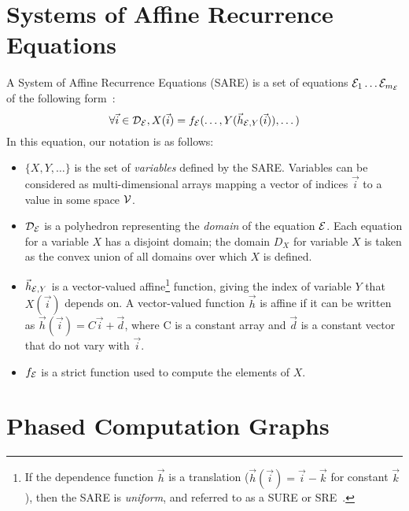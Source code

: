 \section{Systems of Affine Recurrence Equations}

A System of Affine Recurrence Equations (SARE) is a set of equations
${\cal E}_1 \dots {\cal E}_{m_{\cal E}}$ of the following form~\cite{DRV00}:
\begin{equation}
\forall {\vec i} \in {\cal D_{\cal E}}, X({\vec i}) = f_{\cal E}(\dots, Y({\vec h}_{{\cal
E}, Y}({\vec i})), \dots)
\label{eq:sare}
\end{equation}
In this equation, our notation is as follows:
\begin{itemize}

\item $\{X, Y, \dots\}$ is the set of {\it variables} defined by the
SARE.  Variables can be considered as multi-dimensional arrays mapping
a vector of indices ${\vec i}$ to a value in some space ${\cal V}$.

\item ${\cal D_{\cal E}}$ is a polyhedron representing the {\it
domain} of the equation ${\cal E}$.  Each equation for a variable $X$
has a disjoint domain; the domain $D_X$ for variable $X$ is taken as
the convex union of all domains over which $X$ is defined.

\item ${\vec h}_{{\cal E}, Y}$ is a vector-valued affine\footnote{If
the dependence function ${\vec h}$ is a translation (${\vec h}({\vec
i}) = {\vec i} - {\vec k}$ for constant ${\vec k}$), then the SARE is
{\it uniform}, and referred to as a SURE or SRE~\cite{karp67}.}
function, giving the index of variable $Y$ that $X({\vec i})$ depends
on.  A vector-valued function ${\vec h}$ is affine if it can be
written as ${\vec h}({\vec i}) = C{\vec i} + {\vec d}$, where C is a
constant array and ${\vec d}$ is a constant vector that do not vary
with ${\vec i}$.

\item $f_{\cal E}$ is a strict function used to compute the elements
of $X$.

\end{itemize}

\section{Phased Computation Graphs}
\label{sec:pcg}

